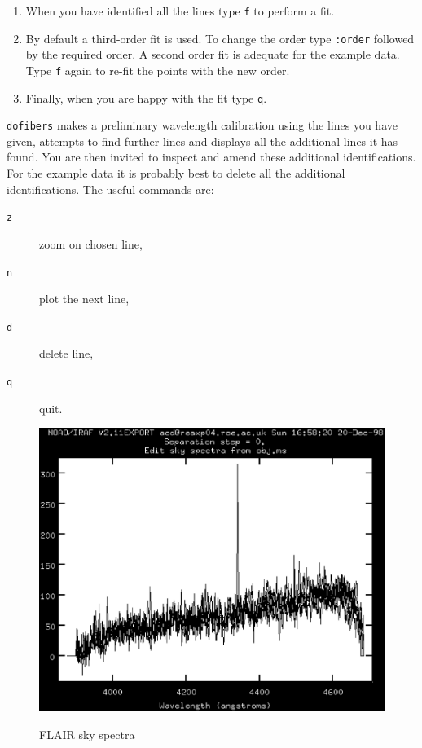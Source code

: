 \documentclass[twoside,11pt]{article}
\begin{document}
\begin{enumerate}
\begin{enumerate}
    \item When you have identified all the lines type {\tt f} to
     perform a fit.

    \item By default a third-order fit is used.  To change the order
     type {\tt :order} followed by the required order.  A second
     order fit is adequate for the example data.  Type {\tt f} again
     to re-fit the points with the new order.

    \item Finally, when you are happy with the fit type {\tt q}.

  \end{enumerate}

   {\tt dofibers} makes a preliminary wavelength calibration using the
   lines you have given, attempts to find further lines and displays
   all the additional lines it has found.  You are then invited to inspect
   and amend these additional identifications.  For the example data
   it is probably best to delete all the additional identifications.
   The useful commands are:

  \begin{description}

    \item[{\tt z}] zoom on chosen line,

    \item[{\tt n}] plot the next line,

    \item[{\tt d}] delete line,

    \item[{\tt q}] quit.

  \end{description}

  \begin{figure}[htbp]
     \centering
     \includegraphics[totalheight=4in]{sc14_flair_sky.ps}
     \begin{quote}
     \caption{FLAIR sky spectra
     \label{FLAIR_SKY} }
     \end{quote}
  \end{figure}


\end{enumerate}
\end{document}
